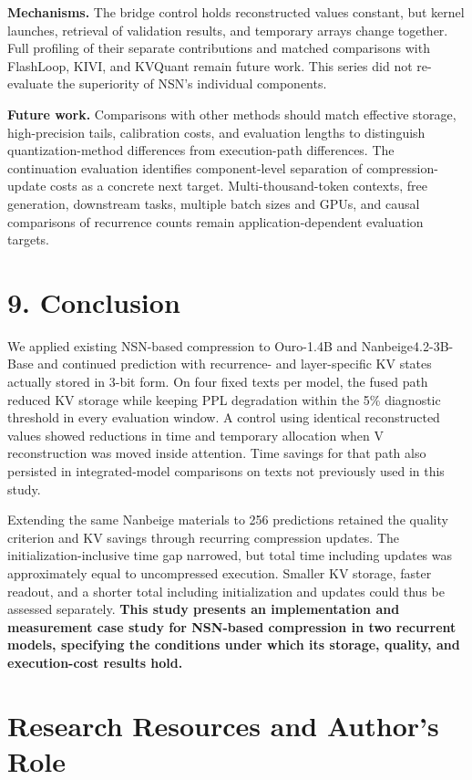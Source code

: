 \documentclass[10pt,a4paper]{article}
\begin{document}
\textbf{Mechanisms.} The bridge control holds reconstructed values constant, but kernel launches, retrieval of validation results, and temporary arrays change together. Full profiling of their separate contributions and matched comparisons with FlashLoop, KIVI, and KVQuant remain future work. This series did not re-evaluate the superiority of NSN's individual components.

\textbf{Future work.} Comparisons with other methods should match effective storage, high-precision tails, calibration costs, and evaluation lengths to distinguish quantization-method differences from execution-path differences. The continuation evaluation identifies component-level separation of compression-update costs as a concrete next target. Multi-thousand-token contexts, free generation, downstream tasks, multiple batch sizes and GPUs, and causal comparisons of recurrence counts remain application-dependent evaluation targets.

\section{9. Conclusion}\label{conclusion}

We applied existing NSN-based compression to Ouro-1.4B and Nanbeige4.2-3B-Base and continued prediction with recurrence- and layer-specific KV states actually stored in 3-bit form. On four fixed texts per model, the fused path reduced KV storage while keeping PPL degradation within the 5\% diagnostic threshold in every evaluation window. A control using identical reconstructed values showed reductions in time and temporary allocation when V reconstruction was moved inside attention. Time savings for that path also persisted in integrated-model comparisons on texts not previously used in this study.

Extending the same Nanbeige materials to 256 predictions retained the quality criterion and KV savings through recurring compression updates. The initialization-inclusive time gap narrowed, but total time including updates was approximately equal to uncompressed execution. Smaller KV storage, faster readout, and a shorter total including initialization and updates could thus be assessed separately. \textbf{This study presents an implementation and measurement case study for NSN-based compression in two recurrent models, specifying the conditions under which its storage, quality, and execution-cost results hold.}

\section{Research Resources and Author's Role}\label{research-resources-and-authors-role}
\end{document}
